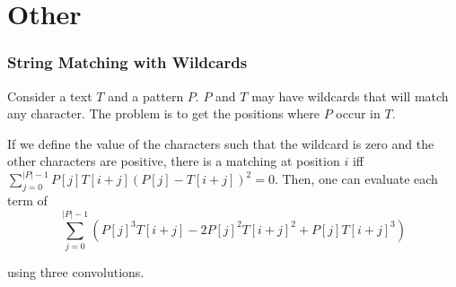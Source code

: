 \section{Other}

\subsubsection{String Matching with Wildcards}


Consider a text $T$ and a pattern $P$. $P$ and $T$ may have wildcards that will match any character. The problem is to get the positions where $P$ occur in $T$.

If we define the value of the characters such that the wildcard is zero and the other characters are positive, there is a matching at position $i$ iff $\sum_{j=0}^{|P|-1}P[j]T[i+j](P[j] - T[i + j])^2 = 0$. Then, one can evaluate each term of 
$$ \sum_{j=0}^{|P|-1}(P[j]^3T[i+j] - 2P[j]^2T[i+j]^2 + P[j]T[i + j]^3) $$ 

using three convolutions.